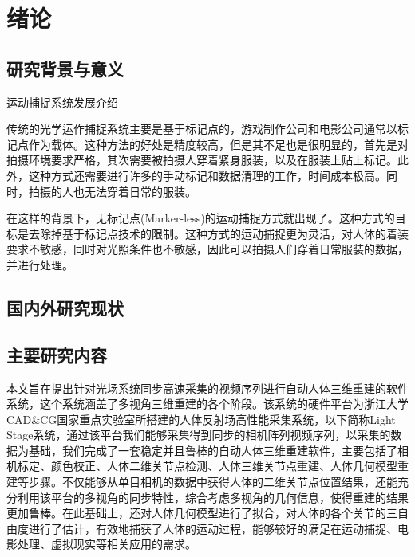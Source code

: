 
\section{绪论}

\subsection{研究背景与意义}
运动捕捉系统发展介绍

传统的光学运作捕捉系统主要是基于标记点的，游戏制作公司和电影公司通常以标记点作为载体。这种方法的好处是精度较高，但是其不足也是很明显的，首先是对拍摄环境要求严格，其次需要被拍摄人穿着紧身服装，以及在服装上贴上标记。此外，这种方式还需要进行许多的手动标记和数据清理的工作，时间成本极高。同时，拍摄的人也无法穿着日常的服装。

在这样的背景下，无标记点(Marker-less)的运动捕捉方式就出现了。这种方式的目标是去除掉基于标记点技术的限制。这种方式的运动捕捉更为灵活，对人体的着装要求不敏感，同时对光照条件也不敏感，因此可以拍摄人们穿着日常服装的数据，并进行处理。


\subsection{国内外研究现状}

\subsection{主要研究内容}
本文旨在提出针对光场系统同步高速采集的视频序列进行自动人体三维重建的软件系统，这个系统涵盖了多视角三维重建的各个阶段。该系统的硬件平台为浙江大学CAD\&CG国家重点实验室所搭建的人体反射场高性能采集系统，以下简称Light Stage系统，通过该平台我们能够采集得到同步的相机阵列视频序列，以采集的数据为基础，我们完成了一套稳定并且鲁棒的自动人体三维重建软件，主要包括了相机标定、颜色校正、人体二维关节点检测、人体三维关节点重建、人体几何模型重建等步骤。不仅能够从单目相机的数据中获得人体的二维关节点位置结果，还能充分利用该平台的多视角的同步特性，综合考虑多视角的几何信息，使得重建的结果更加鲁棒。在此基础上，还对人体几何模型进行了拟合，对人体的各个关节的三自由度进行了估计，有效地捕获了人体的运动过程，能够较好的满足在运动捕捉、电影处理、虚拟现实等相关应用的需求。 